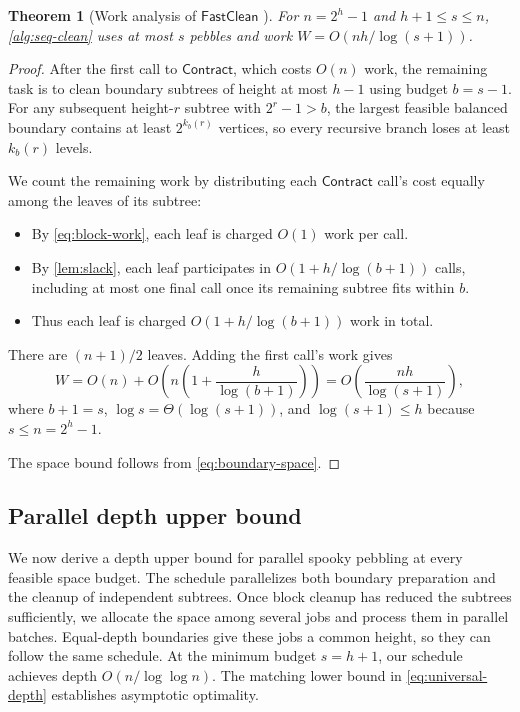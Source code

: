 \documentclass[11pt]{article}
\newtheorem{theorem}{Theorem}[section]
\theoremstyle{definition}
\theoremstyle{remark}
\newcommand{\Clean}{\mathsf{FastClean}}
\newcommand{\Contract}{\mathsf{Contract}}
\begin{document}
\begin{theorem}[Work analysis of $\Clean$ ]
\label{thm:seq-upper}
For $n=2^h-1$ and $h+1\le s\le n$, \cref{alg:seq-clean} uses at most $s$ pebbles and work $W=O(nh/\log(s+1))$.
\end{theorem}
\begin{proof}

After the first call to $\Contract$, which costs $O(n)$ work, the remaining task is to clean boundary subtrees of height at most $h-1$ using budget $b=s-1$. For any subsequent height-$r$ subtree with $2^r-1>b$, the largest feasible balanced boundary contains at least $2^{k_b(r)}$ vertices, so every recursive branch loses at least $k_b(r)$ levels.

We count the remaining work by distributing each $\Contract$ call's cost equally among the leaves of its subtree:
\begin{itemize}
    \item By \cref{eq:block-work}, each leaf is charged $O(1)$ work per call.
    \item By \cref{lem:slack}, each leaf participates in $O(1+h/\log(b+1))$ calls, including at most one final call once its remaining subtree fits within $b$.
    \item Thus each leaf is charged $O(1+h/\log(b+1))$ work in total.
\end{itemize}
There are $(n+1)/2$ leaves. Adding the first call's work gives
\[
W=O(n)+O\!\left(n\left(1+\frac{h}{\log(b+1)}\right)\right)
 =O\!\left(\frac{nh}{\log(s+1)}\right),
\]
where $b+1=s$, $\log s=\Theta(\log(s+1))$, and $\log(s+1)\le h$ because $s\le n=2^h-1$.

The space bound follows from \cref{eq:boundary-space}.

\end{proof}

\subsection{Parallel depth upper bound}
\label{sec:parallel-upper}

We now derive a depth upper bound for parallel spooky pebbling at every feasible space budget. The schedule parallelizes both boundary preparation and the cleanup of independent subtrees. Once block cleanup has reduced the subtrees sufficiently, we allocate the space among several jobs and process them in parallel batches. Equal-depth boundaries give these jobs a common height, so they can follow the same schedule.
At the minimum budget $s=h+1$, our schedule achieves depth $O(n/\log\log n)$. The matching lower bound in \cref{eq:universal-depth} establishes asymptotic optimality.
\end{document}
